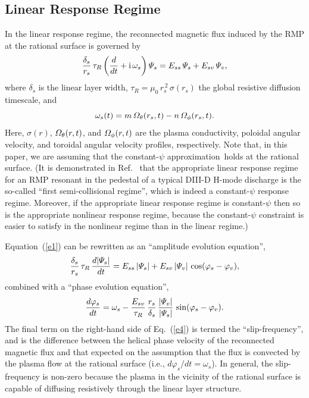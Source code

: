 \documentclass[12pt,prb,aps]{revtex4-1}
\begin{document}
\subsection{Linear Response Regime}
In the linear response regime, the reconnected magnetic flux induced by the RMP at the
rational surface is governed by\,\cite{rfa,rfb,rfc}
\begin{equation}\label{e1}
\frac{\delta_s}{r_s}\,\tau_R\left(\frac{d}{dt}+{\rm i}\,\omega_s\right){\mit\Psi}_s= E_{ss}\,{\mit\Psi}_s+E_{sv}\,{\mit\Psi}_v,
\end{equation}
where $\delta_s$ is the linear layer width, $\tau_R=\mu_0\,r_s^{\,2}\,\sigma(r_s)$ the global resistive diffusion timescale,
 and
\begin{equation}
\omega_s (t)=m\,{\mit\Omega}_\theta(r_s,t)-n\,{\mit\Omega}_\phi(r_s,t).
\end{equation}
Here, $\sigma(r)$, ${\mit\Omega}_\theta(r,t)$, and ${\mit\Omega}_\phi(r,t)$ are the 
plasma conductivity, poloidal angular velocity, and toroidal angular velocity profiles, respectively. 
Note that, in this paper, we are assuming that the constant-$\psi$ approximation\,\cite{fkr} holds at the rational surface. (It is demonstrated in
Ref.~ that the appropriate linear response regime for an RMP resonant in the pedestal of a typical DIII-D H-mode discharge
is the so-called  ``first semi-collisional regime'', which is indeed a constant-$\psi$ response regime. Moreover, if the appropriate linear response regime
is constant-$\psi$ then so is the appropriate nonlinear response regime, because the constant-$\psi$ constraint is
easier to satisfy in the nonlinear regime than in the linear regime.\cite{rfb,rffig})

Equation~(\ref{e1}) can be rewritten as an ``amplitude evolution equation'',
\begin{equation}\label{e3}
\frac{\delta_s}{r_s}\,\tau_R\,\frac{d|{\mit\Psi}_s|}{dt}= E_{ss}\,|{\mit\Psi}_s| + E_{sv}\,|{\mit\Psi}_v|\,\cos(\varphi_s-\varphi_v),
\end{equation}
combined with a ``phase evolution equation'', 
\begin{equation}\label{e4}
\frac{d\varphi_s}{dt} = \omega_s - \frac{E_{sv}}{\tau_R}\,\frac{r_s}{\delta_s}\,\frac{|{\mit\Psi}_v|}{|{\mit\Psi}_s|}\,\sin(\varphi_s-\varphi_v).
\end{equation}
The final term on the right-hand side of Eq.~(\ref{e4}) is termed the ``slip-frequency'', and is the difference between the helical phase velocity of
the reconnected magnetic flux and that expected on the  assumption that the flux is convected by the plasma flow at the
rational surface (i.e., $d\varphi_s/dt=\omega_s$). In general, the slip-frequency is non-zero because the plasma in the vicinity of the rational surface is capable of diffusing resistively 
through the linear layer structure. 
\end{document}
